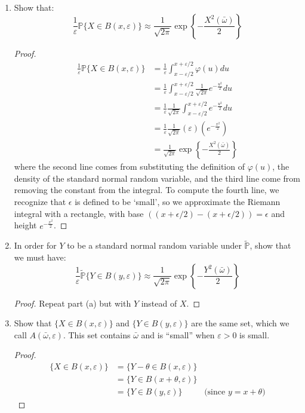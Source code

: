 \documentclass{article}
\newcommand{\p}{\mathbb{P}}
\newcommand{\eps}{\epsilon}
\newcommand{\veps}{\varepsilon}
\newcommand{\seq}[1]{\{ #1 \}}
\theoremstyle{definition}
\theoremstyle{definition}
\begin{document}
\begin{enumerate}
\begin{enumerate}
    \item Show that:
    $$ \frac{1}{\veps} \p \seq{X \in B(x,\veps)} \approx  \frac{1}{\sqrt{2\pi}}\exp \left\{ -\frac{X^2(\bar{\omega})}{2}\right\} $$
    \begin{proof}
        \begin{align*}
         \frac{1}{\veps} \p \seq{X \in B(x,\veps)} &= \frac{1}{\veps}\int_{x-\veps/2}^{x+\veps/2} \varphi(u) du \\
         & = \frac{1}{\veps}\int_{x-\veps/2}^{x+\veps/2} \frac{1}{ \sqrt{2\pi}}e^{-\frac{u^2}{2}} du \\
         &= \frac{1}{\veps} \frac{1}{\sqrt{2\pi}}\int_{x-\veps/2}^{x+\veps/2} e^{-\frac{u^2}{2}} du  \\
         &= \frac{1}{\veps} \frac{1}{\sqrt{2\pi}} (\veps) \left(e^{-\frac{x^2}{2}}\right) \\
         & = \frac{1}{\sqrt{2\pi}}\exp \left\{ -\frac{X^2(\bar{\omega})}{2}\right\}
        \end{align*}
        where the second line comes from substituting the definition of $\varphi(u)$, the density of the standard normal random variable, and the third line come from removing the constant from the integral. To compute the fourth line, we recognize that $\eps$ is defined to be `small', so we approximate the Riemann integral with a rectangle, with base $((x+\eps/2)-(x+\eps/2)) = \eps$ and height $e^{-\frac{x^2}{2}}$.
        
    \end{proof}
    
    \item In order for $Y$ to be a standard normal random variable under $\tilde{\p}$, show that we must have:
    $$ \frac{1}{\veps} \tilde{\p} \seq{Y \in B(y,\veps)} \approx  \frac{1}{\sqrt{2\pi}}\exp \left\{ -\frac{Y^2(\bar{\omega})}{2}\right\}  $$
    
    \begin{proof}
        Repeat part (a) but with $Y$ instead of $X$.
    \end{proof}
    
    \item Show that $\seq{X \in B(x,\veps)}$ and $\seq{Y \in B(y,\veps)}$ are the same set, which we call $A(\bar{\omega},\veps)$. This set contains $\bar{\omega}$ and is ``small'' when $\veps>0$ is small.
    
    \begin{proof}
    \begin{align*}
         \seq{X \in B(x,\veps)} &= \seq{Y-\theta \in B(x,\veps)} \\
         &= \seq{Y \in B(x+\theta,\veps)} \\
         &= \seq{Y \in B(y,\veps)} \; \quad \quad \text{        (since $y=x+\theta$)}
    \end{align*}
    \end{proof}
    

\end{enumerate}
\end{enumerate}
\end{document}
